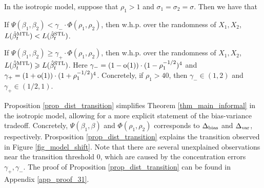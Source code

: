 \begin{proposition}\label{prop_dist_transition}
	In the isotropic model, suppose that $\rho_1 > 1$ and $\sigma_1 = \sigma_2 = \sigma$.
	Then we have that
	\squishlist
		\item If $\Psi(\beta_1, \beta_2) < \gamma_{-} \cdot \Phi(\rho_1, \rho_2)$, then w.h.p. over the randomness of $X_1,X_2$, $L(\hat{\beta}_t^{\text{MTL}}) < L(\hat{\beta}_t^{\text{STL}})$.
		\item If $\Psi(\beta_1, \beta_2) \ge \gamma_{+} \cdot \Phi(\rho_1, \rho_2)$, then w.h.p. over the randomness of $X_1,X_2$, $L(\hat{\beta}_t^{\text{MTL}}) \geqslant L(\hat{\beta}_t^{\text{STL}})$.
	\squishend
	Here $\gamma_{-} = (1-\operatorname{o}(1))\cdot(1 - \rho_1^{-1/2})^4$ and $\gamma_{+} = (1+\operatorname{o}(1))\cdot(1 + \rho_1^{-1/2})^4$.
	Concretely, if $\rho_1 > 40$, then $\gamma_{-} \in (1,2)$ and $\gamma_{+} \in (1/2, 1)$.
\end{proposition}

Proposition \ref{prop_dist_transition} simplifies Theorem \ref{thm_main_informal} in the isotropic model, allowing for a more explicit statement of the bias-variance tradeoff.
Concretely, $\Psi(\beta_1, \beta)$ and $\Phi(\rho_1, \rho_2)$ corresponds to $\Delta_{\text{bias}}$ and $\Delta_{\text{var}}$, respectively.
Prosposition \ref{prop_dist_transition} explains the transition observed in Figure \ref{fig_model_shift}.
Note that there are several unexplained observations near the transition threshold $0$, which are caused by the concentration errors $\gamma_+, \gamma_-$.
The proof of Proposition \ref{prop_dist_transition} can be found in Appendix \ref{app_proof_31}. %

